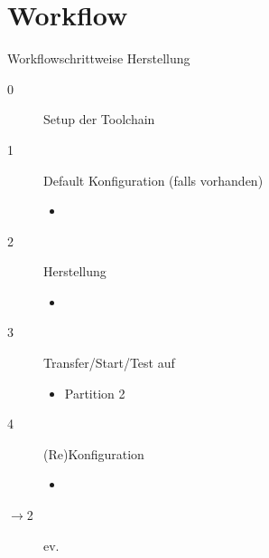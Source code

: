 \section{Workflow}
\begin{frame}{Workflow}{schrittweise Herstellung}
\begin{description}
 \item[0] Setup der Toolchain
 \item[1] Default Konfiguration (falls vorhanden)
 \begin{itemize}
  \item {}
 \end{itemize}
 \item[2] Herstellung 
  \begin{itemize}
   \item {}
  \end{itemize}
 \item[3] Transfer/Start/Test auf \target
 \begin{itemize}
  \item Partition 2 
 \end{itemize}
 \item[4] (Re)Konfiguration
 \begin{itemize}
  \item {}
 \end{itemize}
 \item[$\to$2]  ev.  
\end{description}
\end{frame}
